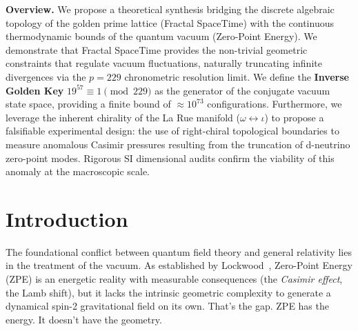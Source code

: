 



\vspace{1em}\noindent\textbf{Overview.}
We propose a theoretical synthesis bridging the discrete algebraic topology of the golden prime lattice (Fractal SpaceTime) with the continuous thermodynamic bounds of the quantum vacuum (Zero-Point Energy). We demonstrate that Fractal SpaceTime provides the non-trivial geometric constraints that regulate vacuum fluctuations, naturally truncating infinite divergences via the $p=229$ chronometric resolution limit. We define the \textbf{Inverse Golden Key} $19^{57} \equiv 1 \pmod{229}$ as the generator of the conjugate vacuum state space, providing a finite bound of $\approx 10^{73}$ configurations. Furthermore, we leverage the inherent chirality of the La Rue manifold ($\omega \leftrightarrow \iota$) to propose a falsifiable experimental design: the use of right-chiral topological boundaries to measure anomalous Casimir pressures resulting from the truncation of d-neutrino zero-point modes. Rigorous SI dimensional audits confirm the viability of this anomaly at the macroscopic scale.
\vspace{1em}


\section{Introduction}\label{sec:intro}

The foundational conflict between quantum field theory and general relativity lies in the treatment of the vacuum. As established by Lockwood~\cite{lockwood2025zpe}, Zero-Point Energy (ZPE) is an energetic reality with measurable consequences (the \emph{Casimir effect}, the Lamb shift), but it lacks the intrinsic geometric complexity to generate a dynamical spin-2 gravitational field on its own. That's the gap. ZPE has the energy. It doesn't have the geometry.


